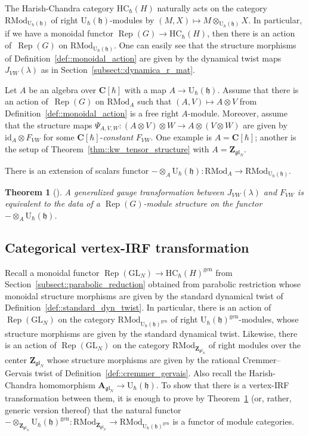 \documentclass[10pt,a4paper]{article}
\numberwithin{equation}{section}
\newtheorem{Theorem}{Theorem}[section]
\newcommand{\C}{\mathbf{C}}
\newcommand{\U}{\mathrm{U}_{\hbar}}
\newcommand{\Z}{\mathbf{Z}}
\newcommand{\A}{\mathbf{A}}
\newcommand{\GL}{\mathrm{GL}}
\newcommand{\h}{\mathfrak{h}}
\newcommand{\gen}{\mathrm{gen}}
\newcommand{\HC}{\mathrm{HC}_{\hbar}}
\newcommand{\id}{\mathrm{id}}
\newcommand{\RMod}{\mathrm{RMod}}
\DeclareMathOperator{\Rep}{Rep}
\newcommand{\gl}{\mathfrak{gl}}
\begin{document}
	The Harish-Chandra category $\HC(H)$ naturally acts on the category $\RMod_{\U(\h)}$ of right $\U(\h)$-modules by
	$
	(M,X) \mapsto M \otimes_{\U(\h)} X$.
	In particular, if we have a monoidal functor $\Rep(G) \rightarrow \HC(H)$, then there is an action of~$\Rep(G)$ on $\RMod_{\U(\h)}$. One can easily see that the structure morphisms of Definition~\ref{def::monoidal_action} are given by the dynamical twist maps $J_{VW}(\lambda)$ as in Section~\ref{subsect::dynamica_r_mat}.
	
	Let $A$ be an algebra over $\C[\hbar]$ with a map $A\rightarrow \U(\h)$. Assume that there is an action of~$\Rep(G)$ on $\RMod_{A}$ such that $(A,V) \mapsto A \otimes V$ from Definition~\ref{def::monoidal_action} is a free right $A$-module. Moreover, assume that the structure maps $\Psi_{A,V,W}\colon (A \otimes V) \otimes W \rightarrow A \otimes (V \otimes W)$ are given by $\id_A \otimes F_{VW}$ for some $\C[\hbar]$-\emph{constant} $F_{VW}$. One example is $A=\C[\hbar]$; another is the setup of Theorem~\ref{thm::kw_tensor_structure} with $A = \Z_{\gl_N}$.
	
	There is an extension of scalars functor $- \otimes_A \U(\h) \colon \RMod_{A} \rightarrow \RMod_{\U(\h)}$.
	\begin{Theorem}[{\cite[Proposition 2.4.3]{Kalmykov}}]
		\label{thm::vertex-irf}
		A generalized gauge transformation between $J_{VW}(\lambda)$ and $F_{VW}$ is equivalent to the data of a $\Rep(G)$-module structure on the functor $-\otimes_A \U(\h)$.
	\end{Theorem}
	
	\subsection{Categorical vertex-IRF transformation}
	
	Recall a monoidal functor $\Rep(\GL_N) \rightarrow \HC(H)^{\gen}$ from Section~\ref{subsect::parabolic_reduction} obtained from parabolic restriction whose monoidal structure morphisms are given by the standard dynamical twist of Definition~\ref{def::standard_dyn_twist}. In particular, there is an action of $\Rep(\GL_N)$ on the category $\RMod_{\U(\h)^{\gen}}$ of right $\U(\h)^{\gen}$-modules, whose structure morphisms are given by the standard dynamical twist. Likewise, there is an action of $\Rep(\GL_N)$ on the category $\RMod_{\Z_{\gl_N}}$ of right modules over the center $\Z_{\gl_N}$ whose structure morphisms are given by the rational Cremmer--Gervais twist of Definition~\ref{def::cremmer_gervais}. Also recall the Harish-Chandra homomorphism $\A_{\gl_{N}} \rightarrow \U(\h)$. To show that there is a vertex-IRF transformation between them, it is enough to prove by Theorem~\ref{thm::vertex-irf} (or, rather, generic version thereof) that the natural functor $- \otimes_{\Z_{\gl_N}} \U(\h)^{\gen}\colon \RMod_{\Z_{\gl_N}} \rightarrow \RMod_{\U(\h)^{\gen}}$ is a functor of module categories.
	
\end{document}
